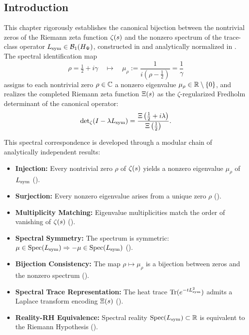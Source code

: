 \subsection*{Introduction}
\label{sec:intro_spectral_correspondence}

This chapter rigorously establishes the canonical bijection between the nontrivial zeros of the Riemann zeta function \(\zeta(s)\) and the nonzero spectrum of the trace-class operator \(L_{\mathrm{sym}} \in \mathcal{B}_1(H_{\Psi})\), constructed in  and analytically normalized in . The spectral identification map
\[
\rho = \tfrac{1}{2} + i\gamma \quad \longmapsto \quad \mu_\rho := \frac{1}{i(\rho - \tfrac{1}{2})} = \frac{1}{\gamma}
\]
assigns to each nontrivial zero \(\rho \in \mathbb{C}\) a nonzero eigenvalue \(\mu_\rho \in \mathbb{R} \setminus \{0\}\), and realizes the completed Riemann zeta function \(\Xi(s)\) as the \(\zeta\)-regularized Fredholm determinant of the canonical operator:
\[
\det\nolimits_\zeta(I - \lambda L_{\mathrm{sym}}) = \frac{\Xi\left( \tfrac{1}{2} + i\lambda \right)}{\Xi\left( \tfrac{1}{2} \right)}.
\]

\medskip

\noindent
This spectral correspondence is developed through a modular chain of analytically independent results:

\begin{itemize}
  \item \textbf{Injection:} Every nontrivial zero \(\rho\) of \(\zeta(s)\) yields a nonzero eigenvalue \(\mu_\rho\) of \(L_{\mathrm{sym}}\) ().
  
  \item \textbf{Surjection:} Every nonzero eigenvalue arises from a unique zero \(\rho\) ().
  
  \item \textbf{Multiplicity Matching:} Eigenvalue multiplicities match the order of vanishing of \(\zeta(s)\) ().
  
  \item \textbf{Spectral Symmetry:} The spectrum is symmetric: \( \mu \in \operatorname{Spec}(L_{\mathrm{sym}}) \Rightarrow -\mu \in \operatorname{Spec}(L_{\mathrm{sym}}) \) ().
  
  \item \textbf{Bijection Consistency:} The map \( \rho \mapsto \mu_\rho \) is a bijection between zeros and the nonzero spectrum ().
  
  \item \textbf{Spectral Trace Representation:} The heat trace \( \operatorname{Tr}(e^{-t L_{\mathrm{sym}}^2}) \) admits a Laplace transform encoding \( \Xi(s) \) ().
  
  \item \textbf{Reality-RH Equivalence:} Spectral reality \( \operatorname{Spec}(L_{\mathrm{sym}}) \subset \mathbb{R} \) is equivalent to the Riemann Hypothesis ().
\end{itemize}

